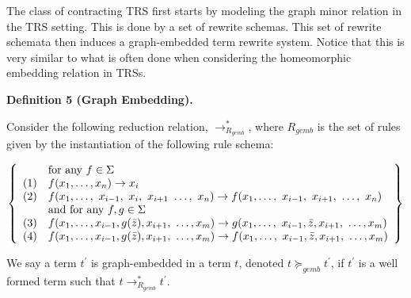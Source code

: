 \documentclass[10pt,a4paper]{amsart}
\begin{document}
 
 
The class of contracting TRS first starts by modeling the graph minor relation in the TRS setting. This is done by a set of rewrite schemas. This set of rewrite schemata then induces a graph-embedded term rewrite system. Notice that this is very similar to what is often done when considering the homeomorphic embedding relation in TRSs.\par
 
 
 
\par\medskip\noindent\textbf{Definition 5 (Graph Embedding).}\par
 
 
Consider the following reduction relation, $\rightarrow^{*}_{R_{gemb}}$, where $R_{gemb}$ is the set of rules given by the instantiation of the following rule schema:\par
    \[\left\{\begin{array}[]{ll}&\text{for any }f\in\Sigma\\
(1)&f(x_{1},\ldots,x_{n})\rightarrow x_{i}\\
(2)&f(x_{1},\ldots,\leavevmode\nobreak\ x_{i-1},\leavevmode\nobreak\ x_{i},%
\leavevmode\nobreak\ x_{i+1}\leavevmode\nobreak\ \ldots,\leavevmode\nobreak\ x%
_{n})\rightarrow f(x_{1},\ldots,\leavevmode\nobreak\ x_{i-1},\leavevmode%
\nobreak\ x_{i+1},\leavevmode\nobreak\ \ldots,\leavevmode\nobreak\ x_{n})\\
&\text{and for any }f,g\in\Sigma\\
(3)&f(x_{1},\ldots,x_{i-1},g(\bar{z}),x_{i+1},\leavevmode\nobreak\ \ldots,x_{m%
})\rightarrow g(x_{1},\ldots,\leavevmode\nobreak\ x_{i-1},\bar{z},x_{i+1},%
\leavevmode\nobreak\ \ldots,x_{m})\\
(4)&f(x_{1},\ldots,x_{i-1},g(\bar{z}),x_{i+1},\leavevmode\nobreak\ \ldots,x_{m%
})\rightarrow f(x_{1},\ldots,\leavevmode\nobreak\ x_{i-1},\bar{z},x_{i+1},%
\leavevmode\nobreak\ \ldots,x_{m})\end{array}\right\}\]    
 
 
We say a term $t^{\prime}$ is graph-embedded in a term $t$, denoted $t\succcurlyeq_{gemb}t^{\prime}$, if $t^{\prime}$ is a well formed term such that $t\rightarrow_{R_{gemb}}^{*}t^{\prime}$.\par
 
\end{document}
